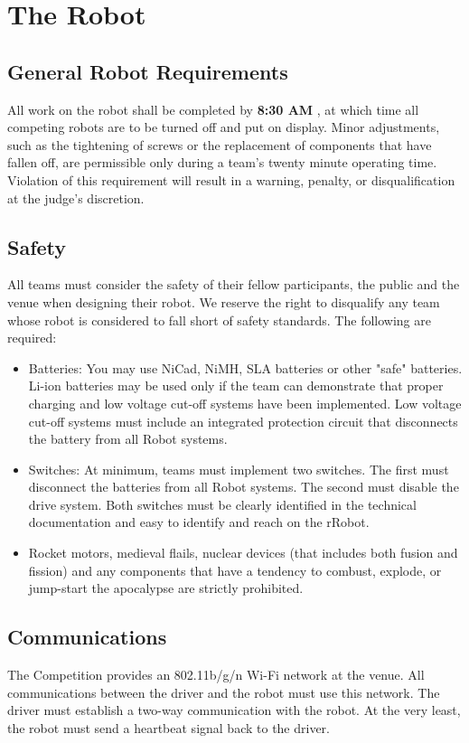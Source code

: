 \section{The Robot}
\subsection{General Robot Requirements}
All work on the robot shall be completed by \textbf{8:30 AM \competition}, at which time all competing robots are to be turned off and put on display. Minor adjustments, such as the tightening of screws or the replacement of components that have fallen off, are permissible only during a team’s twenty minute operating time. Violation of this requirement will result in a warning, penalty, or disqualification at the judge's discretion.

\subsection{Safety}
All teams must consider the safety of their fellow participants, the public and the venue when designing their robot. We reserve the right to disqualify any team whose robot is considered to fall short of safety standards. The following are required:

\begin{itemize}
\item Batteries: You may use NiCad, NiMH, SLA batteries or other "safe" batteries. Li-ion batteries may be used only if the team can demonstrate that proper charging and low voltage cut-off systems have been implemented. Low voltage cut-off systems must include an integrated protection circuit that disconnects the battery from all Robot systems.
\item Switches: At minimum, teams must implement two switches. The first must disconnect the batteries from all Robot systems. The second must disable the drive system. Both switches must be clearly identified in the technical documentation and easy to identify and reach on the rRobot. 
\item Rocket motors, medieval flails, nuclear devices (that includes both fusion and fission) and any components that have a tendency to combust, explode, or jump-start the apocalypse are strictly prohibited.
\end{itemize}

\subsection{Communications}
The Competition provides an 802.11b/g/n Wi-Fi network at the venue. All communications between the driver and the robot must use this network. The driver must establish a two-way communication with the robot. At the very least, the robot must send a heartbeat signal back to the driver.

